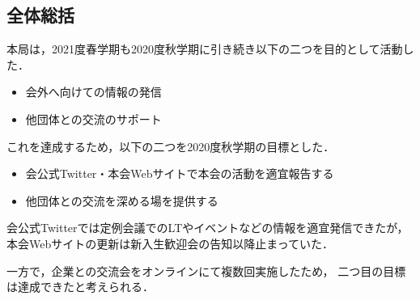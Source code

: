 \subsection*{全体総括}


本局は，2021度春学期も2020度秋学期に引き続き以下の二つを目的として活動した．
\begin{itemize}
    \item 会外へ向けての情報の発信
    \item 他団体との交流のサポート
\end{itemize}
これを達成するため，以下の二つを2020度秋学期の目標とした．
\begin{itemize}
    \item 会公式Twitter・本会Webサイトで本会の活動を適宜報告する
    \item 他団体との交流を深める場を提供する
\end{itemize}

会公式Twitterでは定例会議でのLTやイベントなどの情報を適宜発信できたが，
本会Webサイトの更新は新入生歓迎会の告知以降止まっていた．

一方で，企業との交流会をオンラインにて複数回実施したため，
二つ目の目標は達成できたと考えられる．

